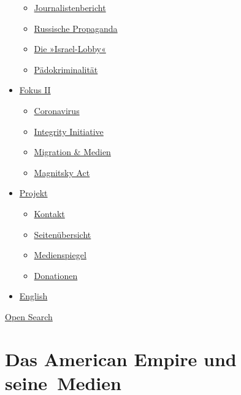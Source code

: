 \begin{itemize}
  \begin{itemize}
  \tightlist
  \item
    \href{https://swprs.org/bericht-eines-journalisten/}{Journalistenbericht}
  \item
    \href{https://swprs.org/russische-propaganda/}{Russische Propaganda}
  \item
    \href{https://swprs.org/die-israel-lobby-fakten-und-mythen/}{Die
    »Israel-Lobby«}
  \item
    \href{https://swprs.org/geopolitik-und-paedokriminalitaet/}{Pädokriminalität}
  \end{itemize}
\item
  \href{https://swprs.org/migration-und-medien/}{Fokus II}

  \begin{itemize}
  \tightlist
  \item
    \href{https://swprs.org/covid-19-hinweis-ii/}{Coronavirus}
  \item
    \href{https://swprs.org/die-integrity-initiative/}{Integrity
    Initiative}
  \item
    \href{https://swprs.org/migration-und-medien/}{Migration \& Medien}
  \item
    \href{https://swprs.org/der-fall-magnitsky/}{Magnitsky Act}
  \end{itemize}
\item
  \href{https://swprs.org/kontakt/}{Projekt}

  \begin{itemize}
  \tightlist
  \item
    \href{https://swprs.org/kontakt/}{Kontakt}
  \item
    \href{https://swprs.org/uebersicht/}{Seitenübersicht}
  \item
    \href{https://swprs.org/medienspiegel/}{Medienspiegel}
  \item
    \href{https://swprs.org/donationen/}{Donationen}
  \end{itemize}
\item
  \href{https://swprs.org/contact/}{English}
\end{itemize}

\protect\hyperlink{}{Open Search}

\hypertarget{das-american-empire-und-seine-medien}{%
\section{Das American Empire und
seine~Medien}\label{das-american-empire-und-seine-medien}}


